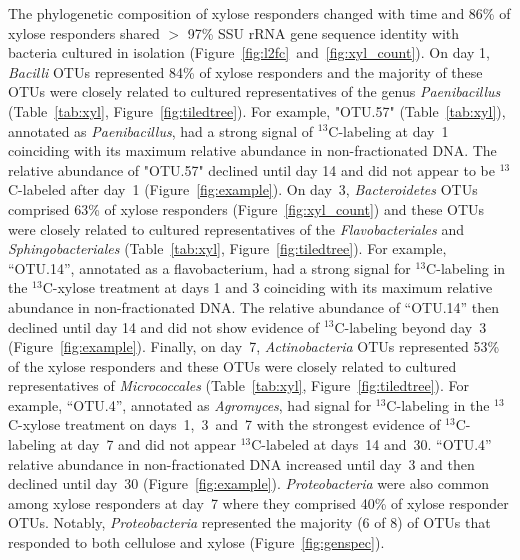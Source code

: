 The phylogenetic composition of xylose responders changed with time and 86\% of
xylose responders shared $>$ 97\% SSU rRNA gene sequence identity with bacteria
cultured in isolation (Figure~\ref{fig:l2fc}~and~\ref{fig:xyl_count}). On day
1, \textit{Bacilli} OTUs represented 84\% of xylose responders and the majority
of these OTUs were closely related to cultured representatives of the genus
\textit{Paenibacillus} (Table~\ref{tab:xyl}, Figure~\ref{fig:tiledtree}). For
example, "OTU.57" (Table~\ref{tab:xyl}), annotated as \textit{Paenibacillus},
had a strong signal of $^{13}$C-labeling at day~1 coinciding with its maximum
relative abundance in non-fractionated DNA. The relative abundance of "OTU.57"
declined until day 14 and did not appear to be $^{13}$C-labeled after day~1
(Figure~\ref{fig:example}). On day~3, \textit{Bacteroidetes} OTUs comprised
63\% of xylose responders (Figure~\ref{fig:xyl_count}) and these OTUs were
closely related to cultured representatives of the \textit{Flavobacteriales}
and \textit{Sphingobacteriales} (Table~\ref{tab:xyl},
Figure~\ref{fig:tiledtree}). For example, ``OTU.14'', annotated as
a flavobacterium, had a strong signal for $^{13}$C-labeling in the
$^{13}$C-xylose treatment at days 1 and 3 coinciding with its maximum relative
abundance in non-fractionated DNA. The relative abundance of ``OTU.14'' then
declined until day 14 and did not show evidence of $^{13}$C-labeling beyond
day~3 (Figure~\ref{fig:example}). Finally, on day~7, \textit{Actinobacteria}
OTUs represented 53\% of the xylose responders and these OTUs were closely
related to cultured representatives of \textit{Micrococcales}
(Table~\ref{tab:xyl}, Figure~\ref{fig:tiledtree}). For example, ``OTU.4'',
annotated as \textit{Agromyces}, had signal for $^{13}$C-labeling in the
$^{13}$C-xylose treatment on days~1,~3~and~7 with the strongest evidence of
$^{13}$C-labeling at day~7 and did not appear $^{13}$C-labeled at days~14
and~30. ``OTU.4'' relative abundance in non-fractionated DNA increased until
day~3 and then declined until day~30 (Figure~\ref{fig:example}).
\textit{Proteobacteria} were also common among xylose responders at day~7 where
they comprised 40\% of xylose responder OTUs. Notably, \textit{Proteobacteria}
represented the majority (6 of 8) of OTUs that responded to both cellulose and
xylose (Figure~\ref{fig:genspec}). 

